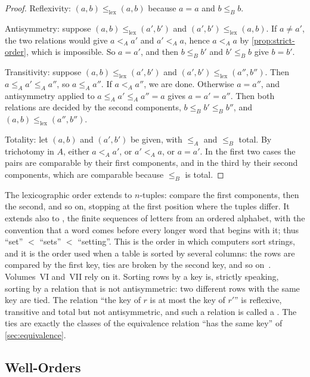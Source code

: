 \begin{proof}
Reflexivity: $(a,b)\le_{\mathrm{lex}}(a,b)$ because $a=a$ and $b\le_Bb$.

Antisymmetry: suppose $(a,b)\le_{\mathrm{lex}}(a',b')$ and $(a',b')\le_{\mathrm{lex}}(a,b)$. If $a\ne a'$, the two relations would give $a<_Aa'$ and $a'<_Aa$, hence $a<_Aa$ by \cref{prop:strict-order}, which is impossible. So $a=a'$, and then $b\le_Bb'$ and $b'\le_Bb$ give $b=b'$.

Transitivity: suppose $(a,b)\le_{\mathrm{lex}}(a',b')$ and $(a',b')\le_{\mathrm{lex}}(a'',b'')$. Then $a\le_Aa'\le_Aa''$, so $a\le_Aa''$. If $a<_Aa''$, we are done. Otherwise $a=a''$, and antisymmetry applied to $a\le_Aa'\le_Aa''=a$ gives $a=a'=a''$. Then both relations are decided by the second components, $b\le_Bb'\le_Bb''$, and $(a,b)\le_{\mathrm{lex}}(a'',b'')$.

Totality: let $(a,b)$ and $(a',b')$ be given, with $\le_A$ and $\le_B$ total. By trichotomy in $A$, either $a<_Aa'$, or $a'<_Aa$, or $a=a'$. In the first two cases the pairs are comparable by their first components, and in the third by their second components, which are comparable because $\le_B$ is total.
\end{proof}

The lexicographic order extends to $n$-tuples: compare the first components, then the second, and so on, stopping at the first position where the tuples differ. It extends also to , the finite sequences of letters from an ordered alphabet, with the convention that a word comes before every longer word that begins with it; thus ``set'' $<$ ``sets'' $<$ ``setting''. This is the order in which computers sort strings, and it is the order used when a table is sorted by several columns: the rows are compared by the first key, ties are broken by the second key, and so on~\cite{knuth1998taocp3}. Volumes~VI and~VII rely on it. Sorting rows by a key is, strictly speaking, sorting by a relation that is not antisymmetric: two different rows with the same key are tied. The relation ``the key of $r$ is at most the key of $r'$'' is reflexive, transitive and total but not antisymmetric, and such a relation is called a . The ties are exactly the classes of the equivalence relation ``has the same key'' of \cref{sec:equivalence}.

\subsection{Well-Orders}

